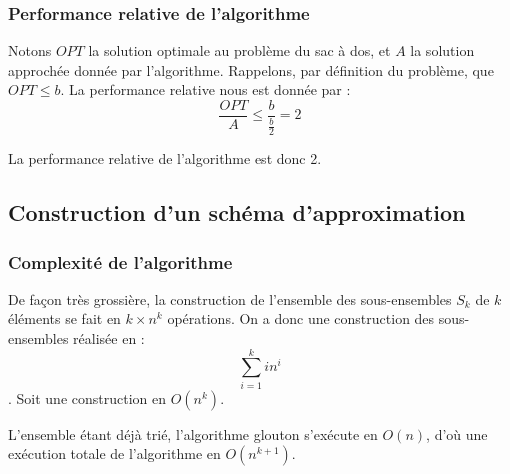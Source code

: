 \subsubsection{Performance relative de l'algorithme}

Notons $OPT$ la solution optimale au problème du sac à dos, et $A$ la solution approchée donnée par
l'algorithme. Rappelons, par définition du problème, que $OPT \leq b $. La performance relative nous
est donnée par : $$
\frac{OPT}{A} \leq \frac{b}{\frac{b}{2}} = 2 $$

La performance relative de l'algorithme est donc 2.

\subsection{Construction d'un schéma d'approximation}

\subsubsection{Complexité de l'algorithme}

De façon très grossière, la construction de l'ensemble des sous-ensembles $S_k$ de $k$ éléments se
fait en $k\times n^k$ opérations. On a donc une construction des sous-ensembles réalisée en : $$
\sum_{i=1}^k i n^i $$. Soit une construction en $O(n^k)$.

L'ensemble étant déjà trié, l'algorithme glouton s'exécute en $O(n)$, d'où une exécution totale de
l'algorithme en $O(n^{k+1})$.

